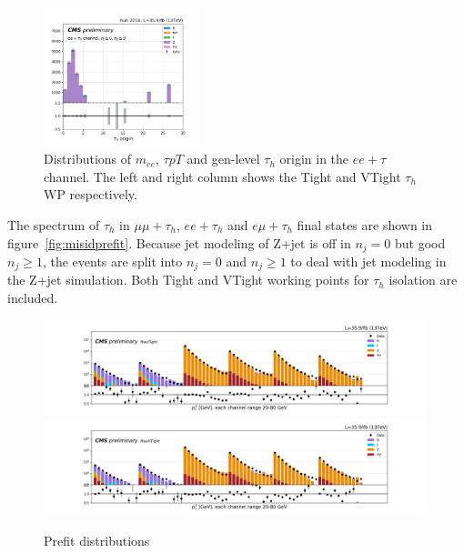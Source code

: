 \begin{figure}
    \includegraphics[width=0.4\textwidth]{chapters/Appendix/sectionJetToTauh/figures/eetau_tauGenFlavor_pickles_lltauVTight.png}
    \caption{Distributions of $m_{ee}$, $\tau pT$ and gen-level $\tau_h$ origin in the $ee+\tau$ channel. The left and right column shows the Tight and VTight $\tau_h$ WP respectively.}
    \label{fig:appendix:fakeTauId:eetau}
\end{figure}


The \pt spectrum of $\tau_h$ in $\mu\mu+\tau_h$, $ee+\tau_h$ and
$e\mu+\tau_h$ final states are shown in figure~\ref{fig:misidprefit}.
Because jet modeling of Z+jet is off in $n_j=0$ but good $n_j \geq 1$,
the events are split into $n_j=0$ and $n_j \geq 1$ to deal with jet
modeling in the Z+jet simulation. Both Tight and VTight working
points for $\tau_h$ isolation are included.

\begin{figure}
    \centering
    \includegraphics[width=0.99\textwidth]{chapters/Appendix/sectionJetToTauh/figures/2020_tauID_prefit_lltauTight.png}
    \includegraphics[width=0.99\textwidth]{chapters/Appendix/sectionJetToTauh/figures/2020_tauID_prefit_lltauVTight.png}
    \caption{Prefit distributions}
    \label{fig:appendix:fakeTauId:prefit}
\end{figure}

